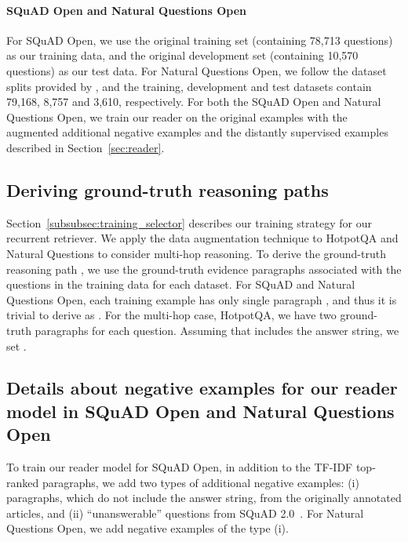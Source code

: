 \documentclass{article} \usepackage{iclr2020_conference,times}
\begin{document}
\paragraph{SQuAD Open and Natural Questions Open}
For SQuAD Open, we use the original training set (containing 78,713 questions) as our training data, and the original development set (containing 10,570 questions) as our test data.
For Natural Questions Open, we follow the dataset splits provided by \cite{min2019discrete}, and the training, development and test datasets contain 79,168, 8,757 and 3,610, respectively.
For both the SQuAD Open and Natural Questions Open, we train our reader on the original examples with the augmented additional negative examples and the distantly supervised examples described in Section~\ref{sec:reader}.


\subsection{Deriving ground-truth reasoning paths}
Section~\ref{subsubsec:training_selector} describes our training strategy for our recurrent retriever.
We apply the data augmentation technique to HotpotQA and Natural Questions to consider multi-hop reasoning.
To derive the ground-truth reasoning path , we use the ground-truth evidence paragraphs associated with the questions in the training data for each dataset.
For SQuAD and Natural Questions Open, each training example has only single paragraph , and thus it is trivial to derive  as .
For the multi-hop case, HotpotQA, we have two ground-truth paragraphs  for each question.
Assuming that  includes the answer string, we set .

\subsection{Details about negative examples for our reader model in SQuAD Open and Natural Questions Open}

To train our reader model for SQuAD Open, in addition to the TF-IDF top-ranked paragraphs, we add two types of additional negative examples: (i) paragraphs, which do not include the answer string, from the originally annotated articles, and (ii) ``unanswerable'' questions from SQuAD 2.0~\citep{rajpurkar-etal-2018-know}. 
For Natural Questions Open, we add negative examples of the type (i). 
\end{document}
